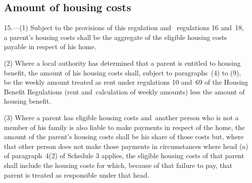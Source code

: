 \documentclass[12pt,a4paper]{article}
\begin{document}
\subsection[15. Amount of housing costs]{Amount of housing costs}

15.—(1) Subject to the provisions of this regulation and~
regulations 16 and~18,  %
a parent’s housing costs shall be the aggregate of the eligible housing costs payable in respect of his home.

(2) Where a local authority has determined that a parent is entitled to housing benefit, the amount of his housing costs shall, subject to paragraphs~(4) to (9), be the weekly amount treated as rent under regulations 10 and~69 of the Housing Benefit Regulations (rent and~calculation of weekly amounts) less the amount of housing benefit.

(3) Where a parent has eligible housing costs and~another person who is not a member of his family is also liable to make payments in respect of the home, the amount of the parent’s housing costs shall be his share of those costs
but, where that other person does not make those payments in circumstances where head ($a$) of paragraph~4(2) of Schedule 3 applies, the eligible housing costs of that parent shall include the housing costs for which, because of that failure to pay, that parent is treated as responsible under that head.  %
\end{document}
